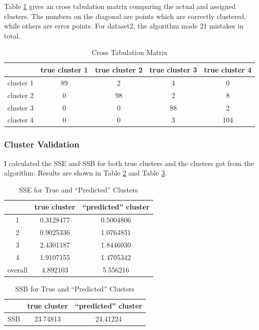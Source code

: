 \documentclass{article}
\begin{document}
		Table \ref{tbl:cross-hard} gives an cross tabulation matrix comparing the actual and assigned clusters. The numbers on the diagonal are points which are correctly clustered, while others are error points. For dataset2, the algorithm made 21 mistakes in total.

		\begin{table}[H]
		\centering
			\begin{tabular}{|c|c|c|c|c|}
			\hline
			 & true cluster 1 & true cluster 2 & true cluster 3 & true cluster 4\\
			 \hline
			 \hline
			 cluster 1 & 89  & 2 &  4 &  0 \\
			 \hline
			 cluster 2 & 0 & 98 &  2  & 8 \\
			 \hline
			 cluster 3 & 0 &  0 & 88  & 2 \\
			 \hline
			 cluster 4 & 0 &  0  & 3& 104 \\
			 \hline
			\end{tabular}
			\caption{Cross Tabulation Matrix}
			\label{tbl:cross-hard}
		\end{table}

		\subsubsection{Cluster Validation}
			I calculated the SSE and SSB for both true clusters and the clusters got from the algorithm. Results are shown in Table \ref{tbl:sse-hard} and Table \ref{tbl:ssb-hard}.

			\begin{table}[H]
			\centering
				\begin{tabular}{|c|c|c|}
					\hline
					& true cluster & ``predicted'' cluster \\ 
					\hline
					1 & 0.3128477 & 0.5004806  \\
					\hline
					2 & 0.9025336 & 1.0764851  \\
					\hline
					3 & 2.4301187 & 1.8446030 \\
					\hline 
					4 & 1.9107155 & 1.4705342 \\
					\hline
					overall & 4.892103 & 5.556216 \\
					\hline
				\end{tabular}
				\caption{SSE for True and ``Predicted'' Clusters}
				\label{tbl:sse-hard}
			\end{table}
			\begin{table}[H]
			\centering
				\begin{tabular}{|c|c|c|}
					\hline
					& true cluster & ``predicted'' cluster \\ 
					\hline
					SSB & 23.74813 & 24.41224 \\ 
					\hline
				\end{tabular}
				\caption{SSB for True and ``Predicted'' Clusters}
				\label{tbl:ssb-hard}
			\end{table}
\end{document}
